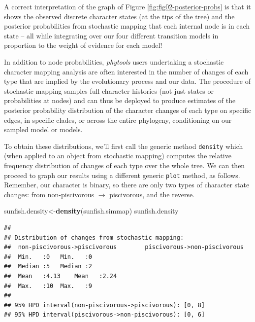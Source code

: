 \documentclass[fleqn,10pt,lineno]{wlpeerj} %
\newenvironment{Shaded}{\begin{snugshade}}{\end{snugshade}}
\newcommand{\FunctionTok}[1]{\textcolor[rgb]{0.13,0.29,0.53}{\textbf{#1}}}
\newcommand{\NormalTok}[1]{#1}
\newcommand{\OtherTok}[1]{\textcolor[rgb]{0.56,0.35,0.01}{#1}}
\begin{document}
A correct interpretation of the graph of Figure \ref{fig:fig02-posterior-probs} is that it shows the observed discrete character states (at the tips of the tree) and the posterior probabilities from stochastic mapping that each internal node is in each state -- all while integrating over our four different transition models in proportion to the weight of evidence for each model!

In addition to node probabilities, \emph{phytools} users undertaking a stochastic character mapping analysis are often interested in the number of changes of each type that are implied by the evolutionary process and our data. The procedure of stochastic mapping samples full character histories (not just states or probabilities at nodes) and can thus be deployed to produce estimates of the posterior probability distribution of the character changes of each type on specific edges, in specific clades, or across the entire phylogeny, conditioning on our sampled model or models.

To obtain these distributions, we'll first call the generic method \texttt{density} which (when applied to an object from stochastic mapping) computes the relative frequency distribution of changes of each type over the whole tree. We can then proceed to graph our results using a different generic \texttt{plot} method, as follows. Remember, our character is binary, so there are only two types of character state changes: from non-piscivorous \(\rightarrow\) piscivorous, and the reverse.

\begin{Shaded}
\begin{Highlighting}[]
\NormalTok{sunfish.density}\OtherTok{\textless{}{-}}\FunctionTok{density}\NormalTok{(sunfish.simmap)}
\NormalTok{sunfish.density}
\end{Highlighting}
\end{Shaded}

\begin{verbatim}
## 
## Distribution of changes from stochastic mapping:
##  non-piscivorous->piscivorous        piscivorous->non-piscivorous
##  Min.   :0   Min.   :0
##  Median :5   Median :2
##  Mean   :4.13    Mean   :2.24
##  Max.   :10  Max.   :9
## 
## 95% HPD interval(non-piscivorous->piscivorous): [0, 8]
## 95% HPD interval(piscivorous->non-piscivorous): [0, 6]
\end{verbatim}
\end{document}
